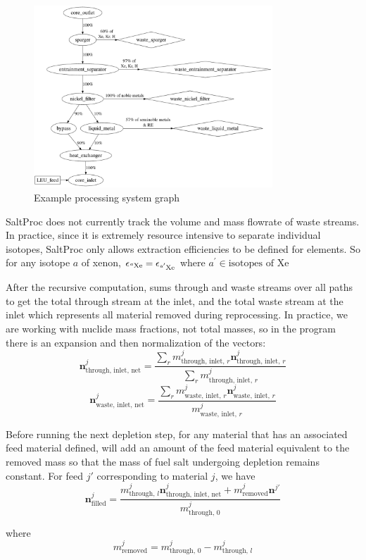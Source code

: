 \begin{figure}[htpb]
    \centering
    \includegraphics[width=0.8\textwidth]{figs/ch3/example_process_graph}
    \caption{Example processing system graph}
    \label{fig:example-graph}
\end{figure}

SaltProc does not currently track the volume and mass flowrate of waste streams.
In practice, since it is extremely resource intensive to separate individual
isotopes, SaltProc only allows extraction efficiencies to be defined for
elements. So for any isotope $a$ of xenon,
$\epsilon_{\ce{^{a}Xe}} = \epsilon_{\ce{^{a^{\prime}}Xe}}$  where
$a^{\prime} \in \text{isotopes of Xe}$

After the recursive computation, \SaltProc sums through and waste streams over all
paths to get the total through stream at the inlet, and the total waste stream at
the inlet which represents all material removed during reprocessing. In practice,
we are working with nuclide mass fractions, not total masses, so in the program
there is an expansion and then normalization of the vectors:
\begin{equation}
    \mathbf{n}^{j}_\text{through, inlet, net} = \frac{\sum_{r} m^{j}_{\text{through, inlet, }r} \mathbf{n}^{j}_{\text{through, inlet, }r}}{\sum_{r} m^{j}_{\text{through, inlet, }r}}
\end{equation}
\begin{equation}
    \mathbf{n}^{j}_{\text{waste, inlet, net}} = \frac{\sum_{r} m^{j}_{\text{waste, inlet, }r} \mathbf{n}^{j}_{\text{waste, inlet, }r}}{m^{j}_{\text{waste, inlet, }r}}
\end{equation}

Before running the next depletion step, for any material that has an associated
feed material defined, \SaltProc will add an amount of the feed material
equivalent to the removed mass so that the mass of fuel salt undergoing depletion
remains constant. For feed $j'$ corresponding to material $j$, we have
\begin{equation}
    \mathbf{n}^{j}_\text{filled} = \frac{m^{j}_{\text{through, }l}\mathbf{n}^{j}_\text{through, inlet, net} +  m^{j}_{\text{removed}}\mathbf{n}^{j'}}{m^{j}_{\text{through, }0}}
\end{equation}

where 
\begin{equation}
    m^{j}_\text{removed} = m^{j}_{\text{through, }0} - m^{j}_{\text{through, }l}
\end{equation}
